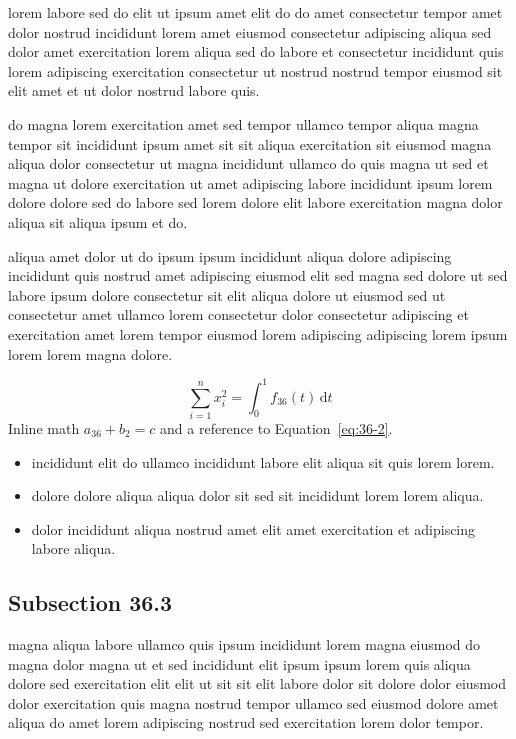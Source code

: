 \documentclass{article}
\begin{document}
lorem labore sed do elit ut ipsum amet elit do do amet consectetur tempor amet dolor nostrud incididunt lorem amet eiusmod consectetur adipiscing aliqua sed dolor amet exercitation lorem aliqua sed do labore et consectetur incididunt quis lorem adipiscing exercitation consectetur ut nostrud nostrud tempor eiusmod sit elit amet et ut dolor nostrud labore quis.

do magna lorem exercitation amet sed tempor ullamco tempor aliqua magna tempor sit incididunt ipsum amet sit sit aliqua exercitation sit eiusmod magna aliqua dolor consectetur ut magna incididunt ullamco do quis magna ut sed et magna ut dolore exercitation ut amet adipiscing labore incididunt ipsum lorem dolore dolore sed do labore sed lorem dolore elit labore exercitation magna dolor aliqua sit aliqua ipsum et do.

aliqua amet dolor ut do ipsum ipsum incididunt aliqua dolore adipiscing incididunt quis nostrud amet adipiscing eiusmod elit sed magna sed dolore ut sed labore ipsum dolore consectetur sit elit aliqua dolore ut eiusmod sed ut consectetur amet ullamco lorem consectetur dolor consectetur adipiscing et exercitation amet lorem tempor eiusmod lorem adipiscing adipiscing lorem ipsum lorem lorem magna dolore.

\begin{equation}\label{eq:36-2}
  \sum_{i=1}^{n} x_i^{2} = \int_0^1 f_{36}(t)\,\mathrm{d}t
\end{equation}
Inline math $a_{36} + b_{2} = c$ and a reference to Equation~\eqref{eq:36-2}.

\begin{itemize}
  \item incididunt elit do ullamco incididunt labore elit aliqua sit quis lorem lorem.
  \item dolore dolore aliqua aliqua dolor sit sed sit incididunt lorem lorem aliqua.
  \item dolor incididunt aliqua nostrud amet elit amet exercitation et adipiscing labore aliqua.
\end{itemize}

\subsection{Subsection 36.3}\label{sec:36-3}
magna aliqua labore ullamco quis ipsum incididunt lorem magna eiusmod do magna dolor magna ut et sed incididunt elit ipsum ipsum lorem quis aliqua dolore sed exercitation elit elit ut sit sit elit labore dolor sit dolore dolor eiusmod dolor exercitation quis magna nostrud tempor ullamco sed eiusmod dolore amet aliqua do amet lorem adipiscing nostrud sed exercitation lorem dolor tempor.
\end{document}
